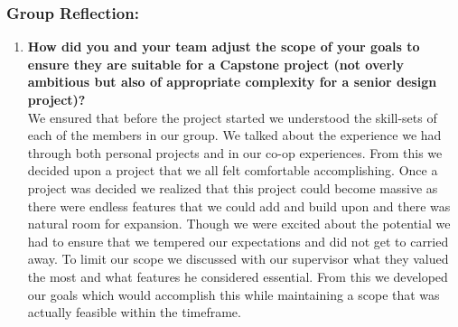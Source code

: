 \documentclass{article}
\begin{document}
\subsubsection*{Group Reflection:}
\begin{enumerate}
    \item \textbf{How did you and your team adjust the scope of your goals to ensure they are suitable for a Capstone project (not overly ambitious but also of appropriate complexity for a senior design project)?} \\
    We ensured that before the project started we understood the skill-sets of each of the members in our group. We talked about the experience we had through both personal projects and in our co-op experiences. From this we decided upon a project that we all felt comfortable accomplishing. Once a project was decided we realized that this project could become massive as there were endless features that we could add and build upon and there was natural room for expansion. Though we were excited about the potential we had to ensure that we tempered our expectations and did not get to carried away. To limit our scope we discussed with our supervisor what they valued the most and what features he considered essential. From this we developed our goals which would accomplish this while maintaining a scope that was actually feasible within the timeframe.
\end{enumerate}
\end{document}
